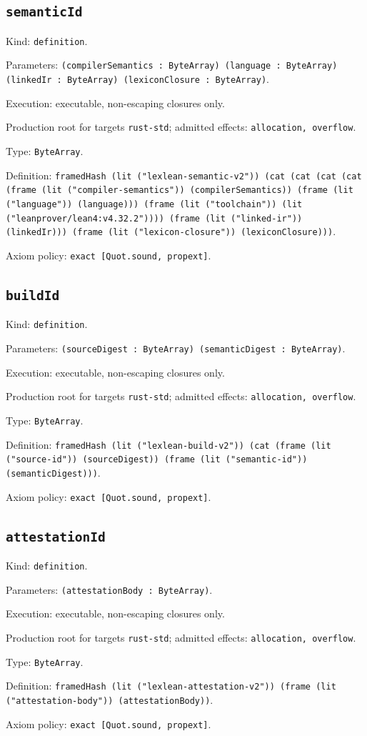 \documentclass[11pt]{article}
\begin{document}
\subsection*{\texttt{semanticId}}
\noindent Kind: \texttt{definition}.\par
\noindent Parameters: \texttt{(compilerSemantics : ByteArray) (language : ByteArray) (linkedIr : ByteArray) (lexiconClosure : ByteArray)}.\par
\noindent Execution: executable, non-escaping closures only.\par
\noindent Production root for targets \texttt{rust-std}; admitted effects: \texttt{allocation, overflow}.\par
\noindent Type: \texttt{ByteArray}.\par
\noindent Definition: \texttt{framedHash (lit ("lexlean-semantic-v2")) (cat (cat (cat (cat (frame (lit ("compiler-semantics")) (compilerSemantics)) (frame (lit ("language")) (language))) (frame (lit ("toolchain")) (lit ("leanprover/lean4:v4.32.2")))) (frame (lit ("linked-ir")) (linkedIr))) (frame (lit ("lexicon-closure")) (lexiconClosure)))}.\par
\noindent Axiom policy: \texttt{exact [Quot.sound, propext]}.\par
\subsection*{\texttt{buildId}}
\noindent Kind: \texttt{definition}.\par
\noindent Parameters: \texttt{(sourceDigest : ByteArray) (semanticDigest : ByteArray)}.\par
\noindent Execution: executable, non-escaping closures only.\par
\noindent Production root for targets \texttt{rust-std}; admitted effects: \texttt{allocation, overflow}.\par
\noindent Type: \texttt{ByteArray}.\par
\noindent Definition: \texttt{framedHash (lit ("lexlean-build-v2")) (cat (frame (lit ("source-id")) (sourceDigest)) (frame (lit ("semantic-id")) (semanticDigest)))}.\par
\noindent Axiom policy: \texttt{exact [Quot.sound, propext]}.\par
\subsection*{\texttt{attestationId}}
\noindent Kind: \texttt{definition}.\par
\noindent Parameters: \texttt{(attestationBody : ByteArray)}.\par
\noindent Execution: executable, non-escaping closures only.\par
\noindent Production root for targets \texttt{rust-std}; admitted effects: \texttt{allocation, overflow}.\par
\noindent Type: \texttt{ByteArray}.\par
\noindent Definition: \texttt{framedHash (lit ("lexlean-attestation-v2")) (frame (lit ("attestation-body")) (attestationBody))}.\par
\noindent Axiom policy: \texttt{exact [Quot.sound, propext]}.\par
\end{document}
